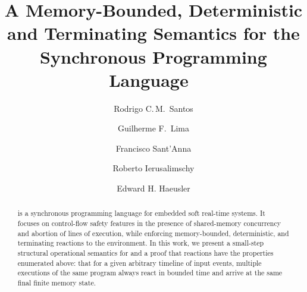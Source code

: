 \documentclass[sigplan,protrusion=true,expansion,screen,tbtags]{acmart}
\begin{document}
\title[A Memory-Bounded, Deterministic and Terminating Semantics for~\CEU]
{A Memory-Bounded, Deterministic and Terminating Semantics for the
       Synchronous Programming Language~\CEU}

\author[Santos]{Rodrigo C.\,M.~Santos}
%
\author[Lima]{Guilherme F.~Lima}
%
\author[Sant'Anna]{Francisco Sant'Anna}
%
\author[Ierusalimschy]{Roberto Ierusalimschy}
%
\author[Haeusler]{Edward H. Haeusler}

\begin{abstract}
\CEU is a synchronous programming language for embedded soft real-time systems.
%
It focuses on control-flow safety features in the presence of shared-memory
concurrency and abortion of lines of execution, while enforcing memory-bounded,
deterministic, and terminating reactions to the environment.
%
In this work, we present a small-step structural operational semantics for
\CEU and a proof that reactions have the properties enumerated above:
%
that for a given arbitrary timeline of input events, multiple executions of the
same program always react in bounded time and arrive at the same final finite
memory state.
%
\end{abstract}


\maketitle












\appendix

\end{document}
